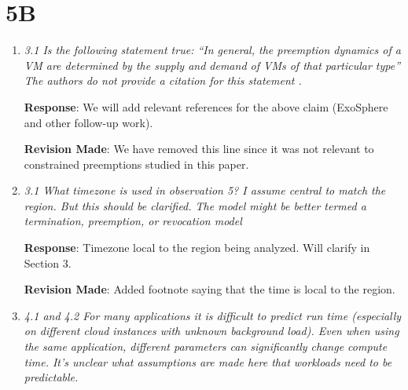 \documentclass{article}
\newcommand{\resp}[1]{\textbf{Response}: #1}
\newcommand{\revmade}[1]{\textbf{Revision Made}: #1}
\begin{document}
\section{5B}

\begin{enumerate}


\item \emph{3.1 Is the following statement true: “In general, the preemption dynamics of a VM are determined by the supply and demand of VMs of that particular type” The authors do not provide a citation for this statement .}

  \resp{We will add relevant references for the above claim (ExoSphere and other follow-up work).}
  

\revmade{We have removed this line since it was not relevant to constrained preemptions studied  in this  paper. }

\item \emph{3.1 What timezone is used in observation 5? I assume central to match the region. But this should be clarified.
The model might be better termed a termination, preemption, or revocation model}

\resp{Timezone local to the region being analyzed. Will clarify in Section 3.}

\revmade{Added footnote saying that the time is local to the region.}








\item \emph{4.1 and 4.2 For many applications it is difficult to predict run time (especially on different cloud instances with unknown background load). Even when using the same application, different parameters can significantly change compute time. It's unclear what assumptions are made here that workloads need to be predictable.}
  

\end{enumerate}
\end{document}
